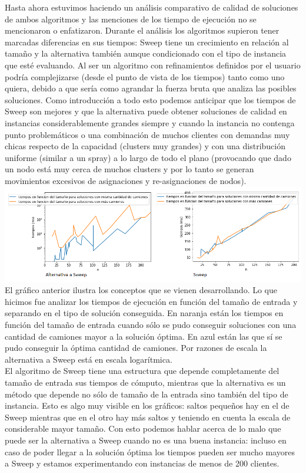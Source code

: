 \documentclass[11pt,a4paper]{article}
\begin{document}
 \bigskip
Hasta ahora estuvimos haciendo un análisis comparativo de calidad de soluciones de ambos algoritmos y las menciones de los tiempo de ejecución no se mencionaron o enfatizaron. Durante el análisis los algoritmos supieron tener marcadas diferencias en sus tiempos: Sweep tiene un crecimiento en relación al tamaño y la alternativa también aunque condicionado con el tipo de instancia que esté evaluando. Al ser un algoritmo con refinamientos definidos por el usuario podría complejizarse (desde el punto de vista de los tiempos) tanto como uno quiera, debido a que sería como agrandar la fuerza bruta que analiza las posibles soluciones. Como introducción a todo esto podemos anticipar que los tiempos de Sweep son mejores y que la alternativa puede obtener soluciones de calidad en instancias considerablemente grandes siempre y cuando la instancia no contenga punto problemáticos o una combinación de muchos clientes con demandas muy chicas respecto de la capacidad (clusters muy grandes) y con una distribución uniforme (similar a un spray) a lo largo de todo el plano (provocando que dado un nodo está muy cerca de muchos clusters y por lo tanto se generan movimientos excesivos de asignaciones y re-asignaciones de nodos).
\\
\center
\includegraphics[scale=.7]{graf/comparativa_tiempos_sweep.png}
El gráfico anterior ilustra los conceptos que se vienen desarrollando. Lo que hicimos fue analizar los tiempos de ejecución en función del tamaño de entrada y separando en el tipo de solución conseguida. 
En naranja están los tiempos en función del tamaño de entrada cuando sólo se pudo conseguir soluciones con una cantidad de camiones mayor a la solución óptima. En azul están las que sí se pudo conseguir la óptima cantidad de camiones. Por razones de escala la alternativa a Sweep está en escala logarítmica. \\
El algoritmo de Sweep tiene una estructura que depende completamente del tamaño de entrada sus tiempos de cómputo, mientras que la alternativa es un método que depende no sólo de tamaño de la entrada sino también del tipo de instancia. Esto es algo muy visible en los gráficos: saltos pequeños hay en el de Sweep mientras que en el otro hay más saltos y teniendo en cuenta la escala de considerable mayor tamaño. Con esto podemos hablar acerca de lo malo que puede ser la alternativa a Sweep cuando no es una buena instancia: incluso en caso de poder llegar a la solución óptima los tiempos pueden ser mucho mayores a Sweep y estamos experimentando con instancias de menos de 200 clientes.
\end{document}
